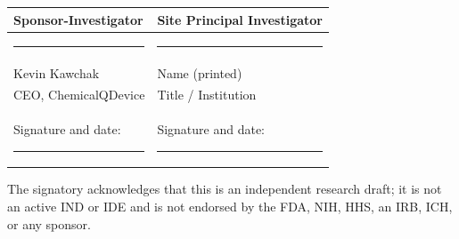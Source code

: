 \vspace{0.6em}

\noindent\begin{tabularx}{\textwidth}{L{8.2cm} Y}
\toprule
\textbf{Sponsor-Investigator} & \textbf{Site Principal Investigator} \\
\midrule
\vspace{1.6em}\rule{6.0cm}{0.4pt} & \vspace{1.6em}\rule{6.0cm}{0.4pt} \\
Kevin Kawchak & Name (printed) \\
CEO, ChemicalQDevice & Title / Institution \\[0.8em]
Signature and date: \rule{2.6cm}{0.4pt} & Signature and date: \rule{2.6cm}{0.4pt} \\
\bottomrule
\end{tabularx}

\vspace{0.4em}

\noindent The signatory acknowledges that this is an independent research draft;
it is not an active IND or IDE and is not endorsed by the FDA, NIH, HHS, an IRB,
ICH, or any sponsor.
